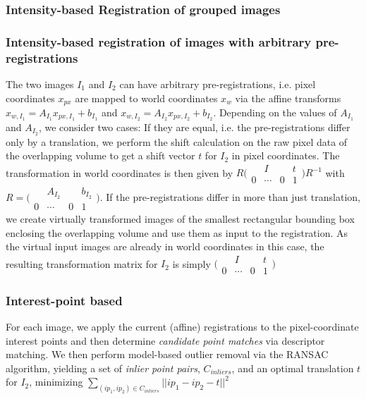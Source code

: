 \subsubsection{Intensity-based Registration of grouped images}

\subsubsection{Intensity-based registration of images with arbitrary pre-registrations}

The two images $I_1$ and $I_2$ can have arbitrary pre-registrations, i.e. pixel coordinates $x_{px}$ are mapped to world coordinates $x_w$ via the affine transforms $x_{w,I_1} = A _{I_1}x_{px,I_1} + b_{I_1}$ and $x_{w,I_2} = A _{I_2}x_{px,I_2} + b_{I_2}$. Depending on the values of $ A _{I_1}$ and $ A _{I_2}$, we consider two cases: If they are equal, i.e. the pre-registrations differ only by a translation, we perform the shift calculation on the raw pixel data of the overlapping volume to get a shift vector $t$ for $I_2$ in pixel coordinates. The transformation in world coordinates is then given by $R \bigl(\begin{smallmatrix}  & I & & t \\  0 & \cdots & 0 & 1 \end{smallmatrix}\bigr) R^{-1} $ with $R = \bigl(\begin{smallmatrix}  & A_{I_2} & & b_{I_2} \\  0 & \cdots & 0 & 1 \end{smallmatrix}\bigr)$. If the pre-registrations differ in more than just translation, we create virtually transformed images of the smallest rectangular bounding box enclosing the overlapping volume and use them as input to the registration. As the virtual input images are already in world coordinates in this case, the resulting transformation matrix for $I_2$ is simply $\bigl(\begin{smallmatrix}  & I & & t \\  0 & \cdots & 0 & 1 \end{smallmatrix}\bigr)$

\subsubsection{Interest-point based}

For each image, we apply the current (affine) registrations to the pixel-coordinate interest points and then determine \emph{candidate point matches} via descriptor matching. We then perform model-based outlier removal via the RANSAC algorithm, yielding a set of \emph{inlier point pairs}, $C_{inliers}$, and an optimal translation $t$ for $I_2$, minimizing $\sum_{(ip_1, ip_2) \in C_{inliers} }{|| ip_1 - ip_2 - t||^2}$

